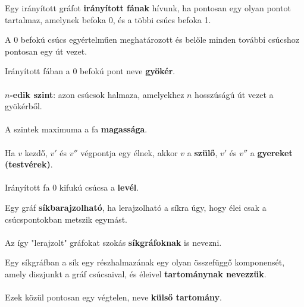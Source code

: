 \begin{frame}
\begin{tcolorbox}[title={Def.: Irányított Fa}]
Egy irányított gráfot \textbf{irányított fának} hívunk, ha pontosan egy olyan pontot tartalmaz, amelynek befoka 0, és a többi csúcs befoka 1.
\end{tcolorbox}

\begin{tcolorbox}[title={Ész}]
A 0 befokú csúcs egyértelműen meghatározott és belőle minden további csúcshoz pontosan egy út vezet.
\end{tcolorbox}

\begin{tcolorbox}[squeezed title={Def.: Gyökér, n-edik szint, Magasság, Szülő, Gyerekek, Levél}]
Irányított fában a 0 befokú pont neve \textbf{gyökér}.\\
\\
\textbf{$n$-edik szint}: azon csúcsok halmaza, amelyekhez $n$ hosszúságú út vezet a gyökérből.\\
\\
A szintek maximuma a fa \textbf{magassága}.\\
\\
Ha $v$ kezdő, $v'$ és $v''$ végpontja egy élnek, akkor $v$ a \textbf{szülő}, $v'$ és $v''$ a \textbf{gyereket (testvérek)}.\\
\\
Irányított fa 0 kifukú csúcsa a \textbf{levél}.
\end{tcolorbox}
\end{frame}


\begin{frame}
\begin{tcolorbox}[title={Def.: Síkgráf}]
Egy gráf \textbf{síkbarajzolható}, ha lerajzolható a síkra úgy, hogy élei csak a csúcspontokban metszik egymást.\\
\\
Az így "lerajzolt" gráfokat szokás \textbf{síkgráfoknak} is nevezni.
\end{tcolorbox}

\begin{tcolorbox}[title={Def.: Tartomány}]
Egy síkgráfban a sík egy részhalmazának egy olyan összefüggő komponensét, amely diszjunkt a gráf csúcsaival, és éleivel \textbf{tartománynak nevezzük}.\\
\\
Ezek közül pontosan egy végtelen, neve \textbf{külső tartomány}.
\end{tcolorbox}
\end{frame}

